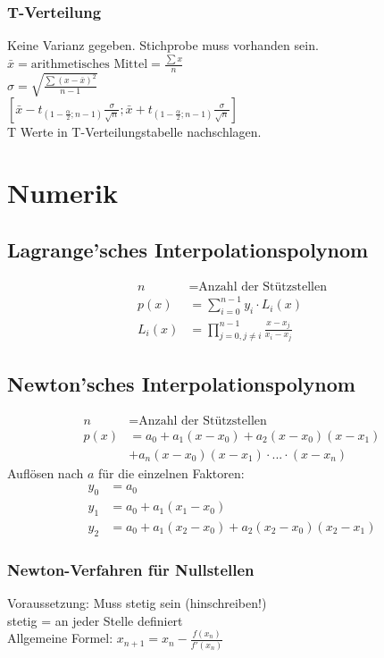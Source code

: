 \documentclass[a4paper, 10pt, landscape]{article}
\begin{document}
\begin{multicols}{5}
\begin{small}
		    	\subsubsection{T-Verteilung}
			    	Keine Varianz gegeben. Stichprobe muss vorhanden sein.\\
				    $\bar{x}=\text{arithmetisches Mittel}=\frac{\sum x}{n}$\\
				    $\sigma=\sqrt{\frac{\sum(x-\bar{x})^{2}}{n-1}}$\\
				    $[\bar{x}-t_{(1-\frac{\alpha}{2};n-1)}\frac{\sigma}{\sqrt{n}};\bar{x}+t_{(1-\frac{\alpha}{2};n-1)}\frac{\sigma}{\sqrt{n}}]$\\
				    T Werte in T-Verteilungstabelle nachschlagen.
	\section{Numerik}
		\subsection{Lagrange'sches Interpolationspolynom}
			\begin{align*}
				n &= \text{Anzahl der Stützstellen}\\
				p(x) &= \sum_{i=0}^{n-1} y_i \cdot L_i(x) \\
				L_i(x) &= \prod_{j = 0, j \neq i}^{n-1} \frac{x - x_j}{x_i - x_j}
			\end{align*}
		\subsection{Newton'sches Interpolationspolynom}
			\begin{align*}
				n &= \text{Anzahl der Stützstellen}\\
				p(x) &= a_0 + a_1(x - x_0) + a_2(x - x_0)(x - x_1)\\
			    &+ a_n(x-x_0)(x - x_1)\cdot ... \cdot (x - x_n)
			\end{align*}
			Auflösen nach $a$ für die einzelnen Faktoren:
			\begin{align*}
				y_0 &= a_0\\
				y_1 &= a_0 + a_1(x_1 - x_0)	\\
				y_2 &= a_0 + a_1(x_2 - x_0) + a_2(x_2 - x_0)(x_2 - x_1)
			\end{align*}
			\subsubsection{Newton-Verfahren für Nullstellen}
				Voraussetzung: Muss stetig sein (hinschreiben!)\\
				stetig = an jeder Stelle definiert\\
				Allgemeine Formel: $x_{n+1}=x_{n}-\frac{f(x_{n})}{f'(x_{n})}$ 

\end{small}
\end{multicols}
\end{document}
